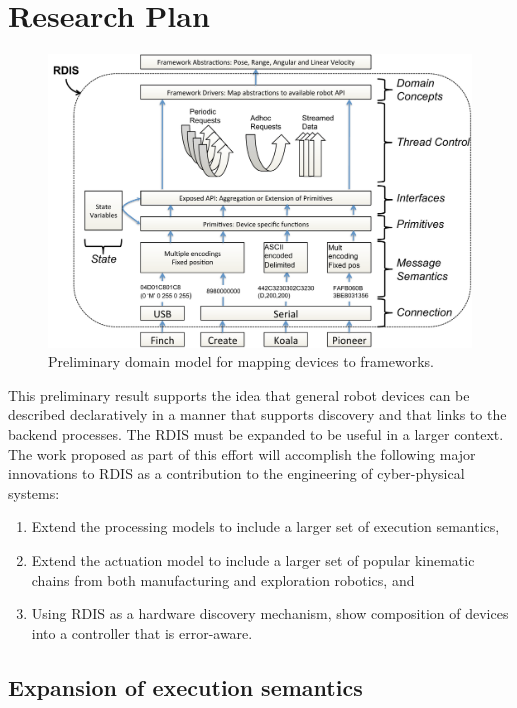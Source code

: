 
\section{Research Plan}
\label{sec:research-plan}

\begin{figure}[thpb]
      \centering
      \includegraphics[width=5in]{dm.pdf}
      \caption{Preliminary domain model for mapping devices to frameworks.}
      \label{dm}
\end{figure}

This preliminary result supports the idea that general robot devices can be described declaratively in a manner that supports discovery and that links to the backend processes.  The RDIS must be expanded to be useful in a larger context.  The work proposed as part of this effort will accomplish the following major innovations to RDIS as a contribution to the engineering of cyber-physical systems: 
\begin{enumerate}
\item Extend the processing models to include a larger set of execution semantics, 
\item Extend the actuation model to include a larger set of popular kinematic chains from both manufacturing and exploration robotics, and
\item Using RDIS as a hardware discovery mechanism, show composition of devices into a controller that is error-aware.   
\end{enumerate}

\subsection{Expansion of execution semantics}

